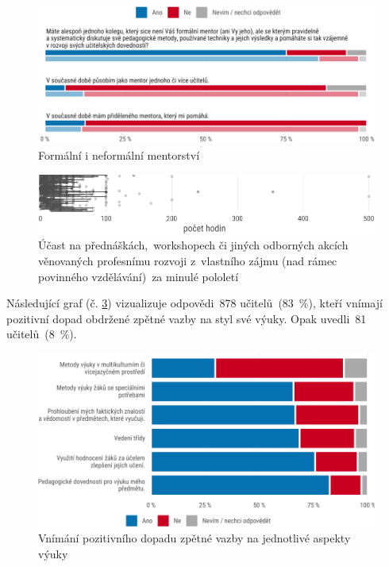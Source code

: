 \documentclass[12pt,a4paper,]{report}
\begin{document}
\begin{figure}

{\centering \includegraphics[width=\textwidth]{figs/mentoring-1} 

}

\caption{Formální i neformální mentorství}\label{fig:mentoring}
\end{figure}

\begin{figure}

{\centering \includegraphics[width=\textwidth]{figs/profDevelop-1} 

}

\caption{Účast na přednáškách, workshopech či jiných odborných akcích věnovaných profesnímu rozvoji z vlastního zájmu (nad rámec povinného vzdělávání) za minulé pololetí}\label{fig:profDevelop}
\end{figure}

\newpage

Následující graf (č. \ref{fig:feedback}) vizualizuje odpovědi~878 učitelů~(83~\%), kteří vnímají pozitivní dopad obdržené zpětné vazby na styl své výuky. Opak uvedli~81 učitelů~(8~\%).

\begin{figure}

{\centering \includegraphics[width=\textwidth]{figs/feedback-1} 

}

\caption{Vnímání pozitivního dopadu zpětné vazby na jednotlivé aspekty výuky}\label{fig:feedback}
\end{figure}
\end{document}
